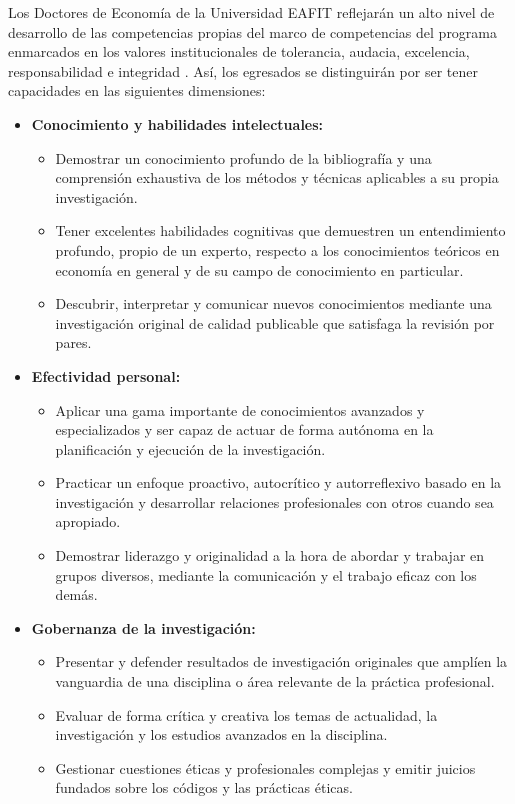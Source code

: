 \begin{tcolorbox}[breakable,colback=blue!5!white,colframe=blue!75!black,title=Perfil de egreso]
  Los Doctores de Economía de la Universidad EAFIT reflejarán un alto nivel de desarrollo de las  competencias propias del marco de competencias del programa enmarcados en los valores institucionales de tolerancia, audacia, excelencia, responsabilidad e integridad . Así, los egresados se distinguirán por ser tener capacidades en las siguientes dimensiones:
  
  \begin{itemize}
      \item \textbf{Conocimiento y habilidades intelectuales: }
      \begin{itemize}
          \item Demostrar un conocimiento profundo de la bibliografía y una comprensión exhaustiva de los métodos y técnicas aplicables a su propia investigación.
          \item Tener excelentes habilidades cognitivas que demuestren un entendimiento profundo, propio de un experto, respecto a los conocimientos teóricos en economía en general y de su campo de conocimiento en particular.
          \item Descubrir, interpretar y comunicar nuevos conocimientos mediante una investigación original de calidad publicable que satisfaga la revisión por pares.
      \end{itemize}
      
            \item \textbf{Efectividad personal: }
      \begin{itemize}
          \item Aplicar una gama importante de conocimientos avanzados y especializados y ser capaz de actuar de forma autónoma en la planificación y ejecución de la investigación.
        \item Practicar un enfoque proactivo, autocrítico y autorreflexivo basado en la investigación y desarrollar relaciones profesionales con otros cuando sea apropiado.
        \item Demostrar liderazgo y originalidad a la hora de abordar y trabajar en grupos diversos, mediante la comunicación y el trabajo eficaz con los demás.
      \end{itemize}

  
  
    \item \textbf{Gobernanza de la investigación: }
      \begin{itemize}
          \item Presentar y defender resultados de investigación originales que amplíen la vanguardia de una disciplina o área relevante de la práctica profesional.
          \item Evaluar de forma crítica y creativa los temas de actualidad, la investigación y los estudios avanzados en la disciplina.
          \item Gestionar cuestiones éticas y profesionales complejas y emitir juicios fundados sobre los códigos y las prácticas éticas.


\end{itemize}
\end{itemize}
\end{tcolorbox}
